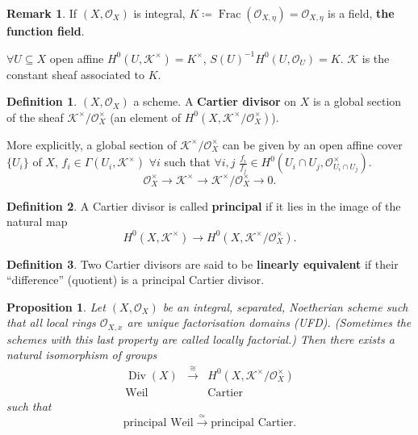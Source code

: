 \documentclass[12pt]{article}
\DeclareMathOperator{\Frac}{Frac}
\DeclareMathOperator{\Div}{Div}
\newtheorem*{proposition}{Proposition}
\theoremstyle{definition}
\newtheorem*{definition}{Definition}
\newtheorem*{remark}{Remark}
\theoremstyle{remark}
\newtheorem*{comment}{Comment}
\begin{document}
\begin{remark}
If $(X,\mathcal{O}_X)$ is integral, $K\coloneqq\Frac(\mathcal{O}_{X,\eta})=\mathcal{O}_{X,\eta}$ is a field, \textbf{the function field}.

$\forall U\subseteq X$ open affine $H^0(U,\mathcal{K}^{\times})=K^{\times}$, $S(U)^{-1}H^0(U,\mathcal{O}_U)=K$. $\mathcal{K}$ is the constant sheaf associated to $K$.
\end{remark}

\begin{definition}
$(X,\mathcal{O}_X)$ a scheme. A \textbf{Cartier divisor} on $X$ is a global section of the sheaf $\mathcal{K}^{\times}/\mathcal{O}_X^{\times}$ (an element of $H^0(X,\mathcal{K}^{\times}/\mathcal{O}_X^{\times})$).
\end{definition}

More explicitly, a global section of $\mathcal{K}^{\times}/\mathcal{O}_X^{\times}$ can be given by an open affine cover $\{U_i\}$ of $X$, $f_i\in\Gamma(U_i,\mathcal{K}^{\times})$ $\forall i$ such that $\forall i,j$ $\frac{f_i}{f_j}\in H^0(U_i\cap U_j,\mathcal{O}_{U_i\cap U_j}^{\times})$.
\[\mathcal{O}_X^{\times}\longrightarrow\mathcal{K}^{\times}\longrightarrow\mathcal{K}^{\times}/\mathcal{O}_X^{\times}\longrightarrow0.\]
\begin{comment}
Units are all equal in $\mathcal{O}_X^{\times}$.
\end{comment}

\begin{definition}
A Cartier divisor is called \textbf{principal} if it lies in the image of the natural map
\[H^0(X,\mathcal{K}^{\times})\longrightarrow H^0(X,\mathcal{K}^{\times}/\mathcal{O}_X^{\times}).\]
\end{definition}

\begin{comment}
Cartier divisors are a connection between Weil divisors and invertible sheaves.
\end{comment}

\begin{definition}
Two Cartier divisors are said to be \textbf{linearly equivalent} if their ``difference'' (quotient) is a principal Cartier divisor.
\end{definition}

\begin{proposition}
Let $(X,\mathcal{O}_X)$ be an integral, separated, Noetherian scheme such that all local rings $\mathcal{O}_{X,x}$ are unique factorisation domains (UFD). (Sometimes the schemes with this last property are called locally factorial.) Then there exists a natural isomorphism of groups
\[
\begin{array}{ccc}
\Div(X)&\overset{\cong}{\longrightarrow}&H^0(X,\mathcal{K}^{\times}/\mathcal{O}_X^{\times})\\
\text{Weil}&&\text{Cartier}
\end{array}
\]
such that
\[\text{principal Weil}\overset{\simeq}{\longrightarrow}\text{principal Cartier}.\]
\end{proposition}
\end{document}
